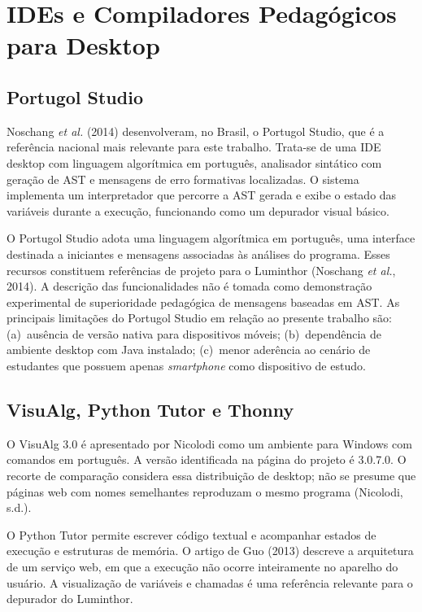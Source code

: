 \documentclass[
    12pt
    ,oneside
    ,a4paper
    ,chapter=TITLE
    ,section=TITLE
    ,sumario=abnt-6027-2012]{abntex2}
\newcommand{\citeNoschang}{(Noschang \textit{et al.}, 2014)}
\newcommand{\textNoschang}{Noschang \textit{et al.} (2014)\xspace}
\begin{document}
\section{IDEs e Compiladores Pedagógicos para Desktop}

\subsection{Portugol Studio}

\textNoschang desenvolveram, no Brasil, o Portugol Studio, que é a
referência nacional mais relevante para este trabalho. Trata-se de uma IDE desktop com
linguagem algorítmica em português, analisador sintático com geração de AST e mensagens de
erro formativas localizadas. O sistema implementa um interpretador que percorre a AST gerada
e exibe o estado das variáveis durante a execução, funcionando como um depurador visual básico.

O Portugol Studio adota uma linguagem algorítmica em português, uma interface
destinada a iniciantes e mensagens associadas às análises do programa. Esses
recursos constituem referências de projeto para o Luminthor \citeNoschang.
A descrição das funcionalidades não é tomada como demonstração experimental
de superioridade pedagógica de mensagens baseadas em AST.
As principais limitações do Portugol Studio em relação ao presente trabalho são: (a)~ausência
de versão nativa para dispositivos móveis; (b)~dependência de ambiente desktop com Java
instalado; (c)~menor aderência ao cenário de estudantes que possuem apenas \textit{smartphone}
como dispositivo de estudo.

\subsection{VisuAlg, Python Tutor e Thonny}
O VisuAlg 3.0 é apresentado por Nicolodi como um ambiente para Windows com
comandos em português. A versão identificada na página do projeto é 3.0.7.0.
O recorte de comparação considera essa distribuição de desktop; não se presume
que páginas web com nomes semelhantes reproduzam o mesmo programa
(Nicolodi, s.d.).

O Python Tutor permite escrever código textual e acompanhar estados de execução
e estruturas de memória. O artigo de Guo (2013) descreve a arquitetura de um serviço web, em que a execução não ocorre inteiramente no aparelho do usuário. A visualização de variáveis e chamadas é uma
referência relevante para o depurador do Luminthor.
\end{document}
